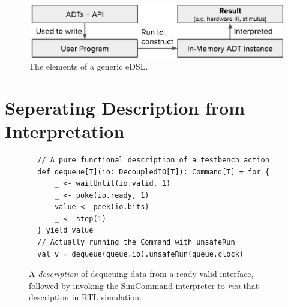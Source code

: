 \documentclass[sigplan,review,nonacm,9pt]{acmart}
\begin{document}

\maketitle

\vspace{-0.5cm}
\begin{figure}[h]
\includegraphics[width=\linewidth]{simcommand/functional_apis.pdf}
\caption{The elements of a generic eDSL.}
\label{fig:functional_apis}
\end{figure}
\vspace{-0.5cm}

\section{Seperating Description from Interpretation}


\begin{figure}[t]
  \begin{verbatim}
  // A pure functional description of a testbench action
  def dequeue[T](io: DecoupledIO[T]): Command[T] = for {
      _ <- waitUntil(io.valid, 1)
      _ <- poke(io.ready, 1)
      value <- peek(io.bits)
      _ <- step(1)
  } yield value
  // Actually running the Command with unsafeRun
  val v = dequeue(queue.io).unsafeRun(queue.clock)
  \end{verbatim}
  \vspace{-4mm}
  \caption{A \textit{description} of dequeuing data from a ready-valid interface, followed by invoking the SimCommand interpreter to \textit{run} that description in RTL simulation.}
  \label{fig:simcommand}
  \vspace{-4.5mm}
  \end{figure}
\end{document}
